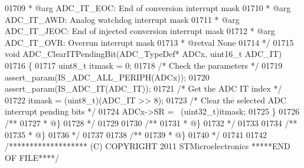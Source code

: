 \begin{DoxyCode}
01709 \textcolor{comment}{  *            @arg ADC\_IT\_EOC: End of conversion interrupt mask}
01710 \textcolor{comment}{  *            @arg ADC\_IT\_AWD: Analog watchdog interrupt mask}
01711 \textcolor{comment}{  *            @arg ADC\_IT\_JEOC: End of injected conversion interrupt mask}
01712 \textcolor{comment}{  *            @arg ADC\_IT\_OVR: Overrun interrupt mask                         }
01713 \textcolor{comment}{  * @retval None}
01714 \textcolor{comment}{  */}
01715 \textcolor{keywordtype}{void} ADC_ClearITPendingBit(ADC\_TypeDef* ADCx, uint16\_t ADC\_IT)
01716 \{
01717   uint8\_t itmask = 0;
01718   \textcolor{comment}{/* Check the parameters */}
01719   assert_param(IS\_ADC\_ALL\_PERIPH(ADCx));
01720   assert_param(IS\_ADC\_IT(ADC\_IT));
01721   \textcolor{comment}{/* Get the ADC IT index */}
01722   itmask = (uint8\_t)(ADC\_IT >> 8);
01723   \textcolor{comment}{/* Clear the selected ADC interrupt pending bits */}
01724   ADCx->SR = ~(uint32\_t)itmask;
01725 \}
01726 \textcolor{comment}{/**}
01727 \textcolor{comment}{  * @\}}
01728 \textcolor{comment}{  */}
01729 
01730 \textcolor{comment}{/**}
01731 \textcolor{comment}{  * @\}}
01732 \textcolor{comment}{  */}
01733 
01734 \textcolor{comment}{/**}
01735 \textcolor{comment}{  * @\}}
01736 \textcolor{comment}{  */}
01737 
01738 \textcolor{comment}{/**}
01739 \textcolor{comment}{  * @\}}
01740 \textcolor{comment}{  */}
01741 
01742 \textcolor{comment}{/******************* (C) COPYRIGHT 2011 STMicroelectronics *****END OF FILE****/}
\end{DoxyCode}
